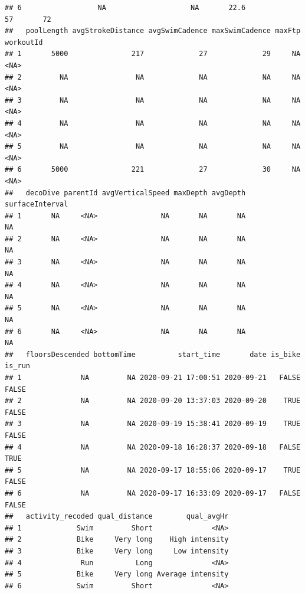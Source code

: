 \documentclass[
]{book}
\newenvironment{Shaded}{\begin{snugshade}}{\end{snugshade}}
\newcommand{\DataTypeTok}[1]{\textcolor[rgb]{0.13,0.29,0.53}{#1}}
\newcommand{\KeywordTok}[1]{\textcolor[rgb]{0.13,0.29,0.53}{\textbf{#1}}}
\newcommand{\NormalTok}[1]{#1}
\newcommand{\OperatorTok}[1]{\textcolor[rgb]{0.81,0.36,0.00}{\textbf{#1}}}
\newcommand{\StringTok}[1]{\textcolor[rgb]{0.31,0.60,0.02}{#1}}
\begin{document}
\begin{verbatim}
## 6                  NA                    NA       22.6            57       72
##   poolLength avgStrokeDistance avgSwimCadence maxSwimCadence maxFtp workoutId
## 1       5000               217             27             29     NA      <NA>
## 2         NA                NA             NA             NA     NA      <NA>
## 3         NA                NA             NA             NA     NA      <NA>
## 4         NA                NA             NA             NA     NA      <NA>
## 5         NA                NA             NA             NA     NA      <NA>
## 6       5000               221             27             30     NA      <NA>
##   decoDive parentId avgVerticalSpeed maxDepth avgDepth surfaceInterval
## 1       NA     <NA>               NA       NA       NA              NA
## 2       NA     <NA>               NA       NA       NA              NA
## 3       NA     <NA>               NA       NA       NA              NA
## 4       NA     <NA>               NA       NA       NA              NA
## 5       NA     <NA>               NA       NA       NA              NA
## 6       NA     <NA>               NA       NA       NA              NA
##   floorsDescended bottomTime          start_time       date is_bike is_run
## 1              NA         NA 2020-09-21 17:00:51 2020-09-21   FALSE  FALSE
## 2              NA         NA 2020-09-20 13:37:03 2020-09-20    TRUE  FALSE
## 3              NA         NA 2020-09-19 15:38:41 2020-09-19    TRUE  FALSE
## 4              NA         NA 2020-09-18 16:28:37 2020-09-18   FALSE   TRUE
## 5              NA         NA 2020-09-17 18:55:06 2020-09-17    TRUE  FALSE
## 6              NA         NA 2020-09-17 16:33:09 2020-09-17   FALSE  FALSE
##   activity_recoded qual_distance        qual_avgHr
## 1             Swim         Short              <NA>
## 2             Bike     Very long    High intensity
## 3             Bike     Very long     Low intensity
## 4              Run          Long              <NA>
## 5             Bike     Very long Average intensity
## 6             Swim         Short              <NA>
\end{verbatim}

\begin{Shaded}
\end{Shaded}
\end{document}
